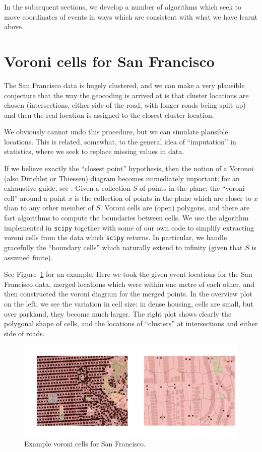 \documentclass[twoside,a4paper,twocolumn,10pt]{article}
\theoremstyle{plain}
\theoremstyle{definition}
\begin{document}
In the subsequent sections, we develop a number of algorithms which seek to
move coordinates of events in ways which are consistent with what we have learnt above.



\section{Voroni cells for San Francisco}

The San Francisco data is hugely clustered, and we can make a very plausible conjecture
that the way the geocoding is arrived at is that cluster locations are chosen (intersections,
either side of the road, with longer roads being split up) and then the real location
is assigned to the closest cluster location.

We obviously cannot undo this procedure, but we can simulate plausible locations.
This is related, somewhat, to the general idea of ``imputation'' in statistics, where we
seek to replace missing values in data.

If we believe exactly the ``closest point'' hypothesis, then the notion of a Voronoi
(also Dirichlet or Thiessen) diagram becomes immediately important;
for an exhaustive guide, see \cite{obs}.
Given a collection $S$
of points in the plane, the ``voroni cell'' around a point $x$ is the collection of points
in the plane which are closer to $x$ than to any other member of $S$.  Voroni cells are (open)
polygons, and there are fast algorithms to compute the boundaries between cells.  We use
the algorithm implemented in \texttt{scipy} together with some of our own code to simplify
extracting voroni cells from the data which \texttt{scipy} returns.  In particular, we handle
gracefully the ``boundary cells'' which naturally extend to infinity (given that $S$ is assumed
finite).

See Figure~\ref{fig:sf_vor_1} for an example.  Here we took the given event locations for the
San Francisco data, merged locations which were within one metre of each other, and then
constructed the voroni diagram for the merged points.  In the overview plot on the left,
we see the variation in cell size: in dense housing, cells are small, but over parkland, they
become much larger.  The right plot shows clearly the polygonal shape of cells, and the locations
of ``clusters'' at intersections and either side of roads.

\begin{figure}
  \includegraphics[width=\textwidth]{sf_vor_1.png}
  \caption{Example voroni cells for San Francisco.}
  \label{fig:sf_vor_1}
\end{figure}
\end{document}
